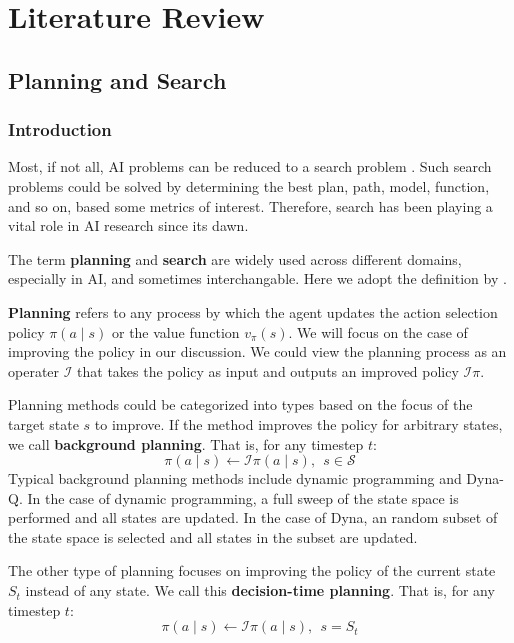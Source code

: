 \documentclass[12pt]{article}
\newcommand{\note}[1]{\todo[color=yellow!40,bordercolor=none,linecolor=black]{#1}}
\begin{document}
\section{Literature Review}
\note{4 - 5 pages}

\subsection{Planning and Search}
\subsubsection{Introduction}
Most, if not all, AI problems can be reduced to a search problem \cite[p.39]{ArtificialIntelligenceGames_Yannakakis.Togelius_2018}.
Such search problems could be solved by determining the best plan, path, model, function, and so on, based some metrics of interest.
Therefore, search has been playing a vital role in AI research since its dawn.

The term \textbf{planning} and \textbf{search} are widely used across different domains, especially in AI, and sometimes interchangable.
Here we adopt the definition by \citeauthor{ReinforcementLearningIntroduction_Sutton.Barto_2018} \cite{ReinforcementLearningIntroduction_Sutton.Barto_2018}.

\textbf{Planning} refers to any process by which the agent updates the action selection policy $\pi(a \mid s)$ or the value function $v_\pi(s)$.
We will focus on the case of improving the policy in our discussion.
We could view the planning process as an operater $\mathcal{I}$ that takes the policy as input and outputs an improved policy $\mathcal{I}\pi$.

Planning methods could be categorized into types based on the focus of the target state $s$ to improve.
If the method improves the policy for arbitrary states, we call \textbf{background planning}.
That is, for any timestep $t$:
$$\pi(a \mid s) \leftarrow \mathcal{I}\pi(a \mid s), ~~ s \in \mathcal{S}$$
Typical background planning methods include dynamic programming and Dyna-Q.
In the case of dynamic programming, a full sweep of the state space is performed and all states are updated.
In the case of Dyna, an random subset of the state space is selected and all states in the subset are updated.

The other type of planning focuses on improving the policy of the current state $S_t$ instead of any state.
We call this \textbf{decision-time planning}.
That is, for any timestep $t$:
$$\pi(a \mid s) \leftarrow \mathcal{I}\pi(a \mid s), ~~ s = S_t$$
\end{document}
